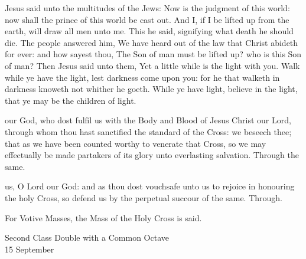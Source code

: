 Jesus said unto the multitudes of the Jews: Now is the judgment of this world: now shall the prince of this world be cast out. And I, if I be lifted up from the earth, will draw all men unto me. This he said, signifying what death he should die. The people answered him, We have heard out of the law that Christ abideth for ever: and how sayest thou, The Son of man must be lifted up? who is this Son of man? Then Jesus said unto them, Yet a little while is the light with you. Walk while ye have the light, lest darkness come upon you: for he that walketh in darkness knoweth not whither he goeth. While ye have light, believe in the light, that ye may be the children of light.


\secret
{} our God, who dost fulfil us with the Body and Blood of Jesus Christ our Lord, through whom thou hast sanctified the standard of the Cross: we beseech thee; that as we have been counted worthy to venerate that Cross, so we may effectually be made partakers of its glory unto everlasting salvation. Through the same.


\postcommunion
{} us, O Lord our God: and as thou dost vouchsafe unto us to rejoice in honouring the holy Cross, so defend us by the perpetual succour of the same. Through.

\begin{rubric}
	For Votive Masses, the Mass of the Holy Cross is said.
\end{rubric}



\begin{inhead}
    {Second Class Double with a Common Octave\\
15 September}
\end{inhead}
\par\noindent
{}

